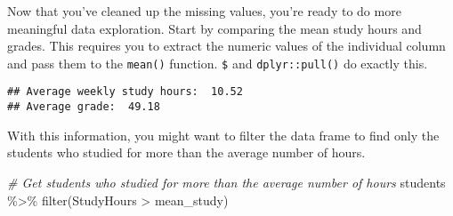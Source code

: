 \documentclass[
]{article}
\newenvironment{Shaded}{\begin{snugshade}}{\end{snugshade}}
\newcommand{\CommentTok}[1]{\textcolor[rgb]{0.56,0.35,0.01}{\textit{#1}}}
\newcommand{\DecValTok}[1]{\textcolor[rgb]{0.00,0.00,0.81}{#1}}
\newcommand{\FunctionTok}[1]{\textcolor[rgb]{0.00,0.00,0.00}{#1}}
\newcommand{\NormalTok}[1]{#1}
\newcommand{\OtherTok}[1]{\textcolor[rgb]{0.56,0.35,0.01}{#1}}
\newcommand{\SpecialCharTok}[1]{\textcolor[rgb]{0.00,0.00,0.00}{#1}}
\newcommand{\StringTok}[1]{\textcolor[rgb]{0.31,0.60,0.02}{#1}}
\begin{document}
Now that you've cleaned up the missing values, you're ready to do more
meaningful data exploration. Start by comparing the mean study hours and
grades. This requires you to extract the numeric values of the
individual column and pass them to the \texttt{mean()} function.
\texttt{\$} and \texttt{dplyr::pull()} do exactly this.

\begin{Shaded}
\end{Shaded}

\begin{verbatim}
## Average weekly study hours:  10.52 
## Average grade:  49.18
\end{verbatim}

With this information, you might want to filter the data frame to find
only the students who studied for more than the average number of hours.

\begin{Shaded}
\begin{Highlighting}[]
\CommentTok{\# Get students who studied for more than the average number of hours}
\NormalTok{students }\SpecialCharTok{\%\textgreater{}\%} 
  \FunctionTok{filter}\NormalTok{(StudyHours }\SpecialCharTok{\textgreater{}}\NormalTok{ mean\_study)}
\end{Highlighting}
\end{Shaded}
\end{document}
